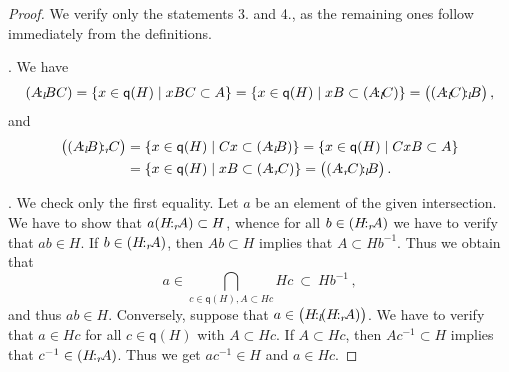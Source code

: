 \documentclass[a4paper]{amsart}
\theoremstyle{definition}
\numberwithin{equation}{section}
\begin{document}
\begin{proof}
We verify only the statements 3. and 4., as the remaining ones
follow immediately from the definitions.

.  We have
\[
(A {\negthinspace :_l \negthinspace} B C) = \{ x \in \mathsf q (H) \mid x B C \subset A \} = \{ x
\in \mathsf q (H) \mid x B \subset (A {\negthinspace :_l \negthinspace} C) \} = \big( (A {\negthinspace :_l \negthinspace} C)
{\negthinspace :_l \negthinspace} B \big) \,,
\]
and
\[
\begin{aligned}
\big( (A {\negthinspace :_l \negthinspace} B) {\negthinspace :_r \negthinspace} C \big) & = \{ x \in \mathsf q (H) \mid Cx
\subset (A {\negthinspace :_l \negthinspace} B) \} = \{ x \in \mathsf q (H) \mid CxB \subset A \}
\\
& = \{ x \in \mathsf q (H) \mid xB \subset (A {\negthinspace :_r \negthinspace} C) \} = \big( (A
{\negthinspace :_r \negthinspace} C) {\negthinspace :_l \negthinspace} B \big) \,.
\end{aligned}
\]

. We check only the first equality. Let $a$ be an element of the given
intersection. We have to show that $a (H {\negthinspace :_r \negthinspace} A) \subset H$, whence
for all $b \in (H {\negthinspace :_r \negthinspace} A)$ we have to verify that $ab \in H$. If $b
\in (H {\negthinspace :_r \negthinspace} A)$, then $A b \subset H$ implies that $A \subset H
b^{-1}$. Thus we obtain that
\[
a \in \bigcap_{c \in \mathsf q (H), A \subset Hc} Hc \ \subset \
Hb^{-1} \,,
\]
and thus $ab \in H$. Conversely, suppose that $a \in \big( H {\negthinspace :_l \negthinspace} (H
{\negthinspace :_r \negthinspace} A) \big)$. We have to verify that $a \in Hc$ for all $c \in
\mathsf q (H)$ with $A \subset Hc$. If $A \subset Hc$, then $A
c^{-1} \subset H$ implies that $c^{-1} \in (H {\negthinspace :_r \negthinspace} A)$. Thus we get
$ac^{-1} \in H$ and $a \in Hc$.
\end{proof}
\end{document}
